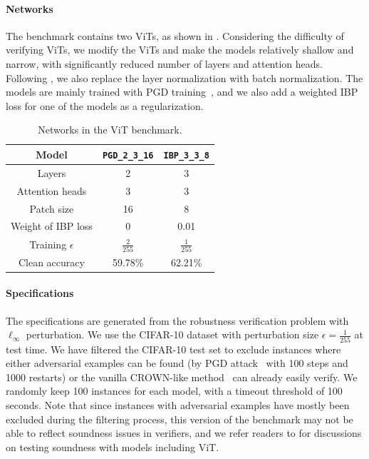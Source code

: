 \documentclass[oneside,11pt,dvipsnames]{book}
\begin{document}
\paragraph*{Networks}
The benchmark contains two ViTs, as shown in .
Considering the difficulty of verifying ViTs, we modify the ViTs and make the models relatively shallow and narrow, with significantly reduced number of layers and attention heads.
Following \cite{shi2019robustness}, we also replace the layer normalization with batch normalization.
The models are mainly trained with PGD training~\cite{madry2017towards}, and we also add a weighted IBP~\cite{gowal2018effectiveness,shi2021fast} loss for one of the models as a regularization.

\begin{table}[ht]
\centering
\caption{Networks in the ViT benchmark.}
\label{tab:vits}
\begin{tabular}{ccc}
\toprule 
Model & \texttt{PGD\_2\_3\_16} & \texttt{IBP\_3\_3\_8} \\
\midrule
Layers & 2 & 3\\
Attention heads & 3 & 3\\
Patch size & 16 & 8\\
Weight of IBP loss & 0 & 0.01\\
Training $\epsilon$ & $\frac{2}{255}$ & $\frac{1}{255}$\\
Clean accuracy & 59.78\% & 62.21\%\\
\bottomrule
\end{tabular}
\end{table}

\paragraph*{Specifications} 
The specifications are generated from the robustness verification problem with $\ell_\infty$ perturbation. 
We use the CIFAR-10 dataset with perturbation size $\epsilon=\frac{1}{255}$ at test time.
We have filtered the CIFAR-10 test set to exclude instances where either adversarial examples can be found (by PGD attack~\cite{madry2017towards} with 100 steps and 1000 restarts) or the vanilla CROWN-like method~\cite{zhang2018efficient,shi2019robustness} can already easily verify. 
We randomly keep 100 instances for each model, with a timeout threshold of 100 seconds. 
Note that since instances with adversarial examples have mostly been excluded during the filtering process, this version of the benchmark may not be able to reflect soundness issues in verifiers, and we refer readers to \cite{zhou2024testing} for discussions on testing soundness with models including ViT.
\end{document}

